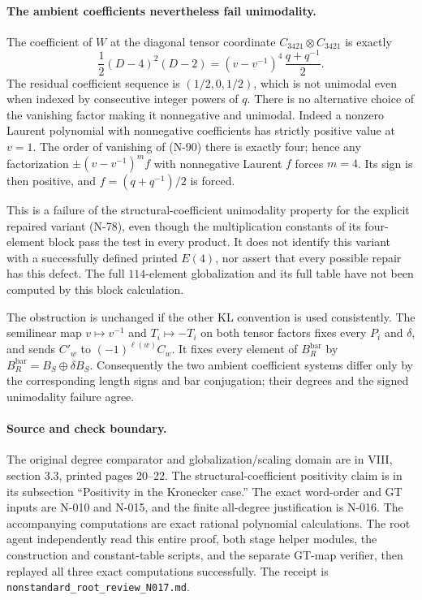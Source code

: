 \paragraph{The ambient coefficients nevertheless fail unimodality.}
The coefficient of $W$ at the diagonal tensor coordinate
$C_{3421}\otimes C_{3421}$ is exactly
\[
 \frac12(D-4)^2(D-2)
   =(v-v^{-1})^4\,\frac{q+q^{-1}}2.
 \tag{N-90}
\]
The residual coefficient sequence is $(1/2,0,1/2)$, which is not
unimodal even when indexed by consecutive integer powers of $q$.
There is no alternative choice of the vanishing factor making it
nonnegative and unimodal.  Indeed a nonzero Laurent polynomial with
nonnegative coefficients has strictly positive value at $v=1$.
The order of vanishing of (N-90) there is exactly four; hence any
factorization $\pm(v-v^{-1})^m f$ with nonnegative Laurent $f$ forces
$m=4$.  Its sign is then positive, and $f=(q+q^{-1})/2$ is forced.

This is a failure of the structural-coefficient unimodality property
for the explicit repaired variant (N-78), even though the
multiplication constants of its four-element block pass the test
in every product.  It does
not identify this variant with a successfully defined printed $E(4)$,
nor assert that every possible repair has this defect.  The full
$114$-element globalization and its full table have not been
computed by this block calculation.

The obstruction is unchanged if the other KL convention is used
consistently.  The semilinear map $v\mapsto v^{-1}$ and
$T_i\mapsto-T_i$ on both tensor factors fixes every $P_i$ and
$\delta$, and sends $C'_w$ to $(-1)^{\ell(w)}C_w$.
It fixes every element of $B_R^{\mathrm{bar}}$ by
$B_R^{\mathrm{bar}}=B_S\oplus\delta B_S$.
Consequently the two ambient coefficient systems differ only by
the corresponding length signs and bar conjugation; their degrees
and the signed unimodality failure agree.

\paragraph{Source and check boundary.}
The original degree comparator and globalization/scaling domain are
in VIII, section 3.3, printed pages 20--22.  The structural-coefficient
positivity claim is in its subsection ``Positivity in the Kronecker
case.''  The exact word-order and GT inputs are N-010 and N-015,
and the finite all-degree justification is N-016.  The accompanying
computations are exact rational polynomial calculations.  The root
agent independently read this entire proof, both stage helper modules,
the construction and constant-table scripts, and the separate GT-map
verifier, then replayed all three exact computations successfully.
The receipt is \nolinkurl{nonstandard_root_review_N017.md}.
